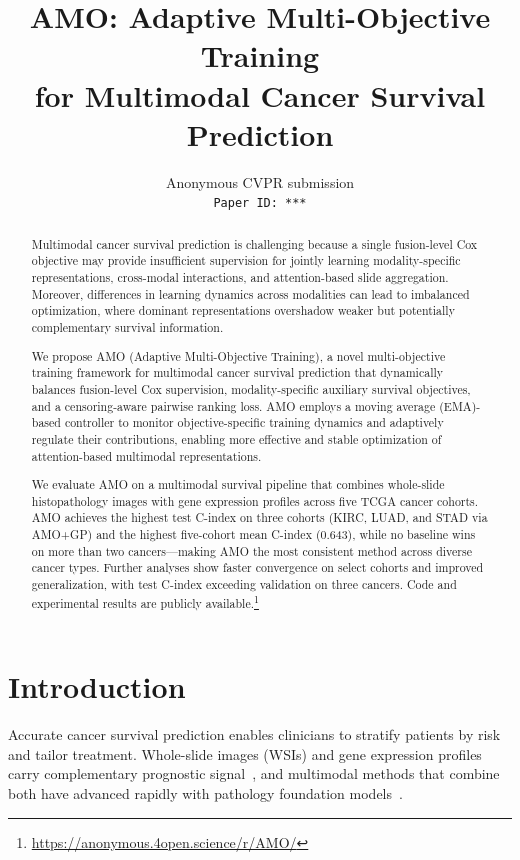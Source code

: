 \documentclass[10pt,twocolumn,letterpaper]{article}
\title{AMO: Adaptive Multi-Objective Training\\for Multimodal Cancer Survival Prediction}
\author{Anonymous CVPR submission\\
{\tt\small Paper ID: ***}}
\begin{document}
\maketitle

\begin{abstract}
Multimodal cancer survival prediction is challenging because a
single fusion-level Cox objective may provide insufficient
supervision for jointly learning modality-specific representations,
cross-modal interactions, and attention-based slide aggregation.
Moreover, differences in learning dynamics across modalities can
lead to imbalanced optimization, where dominant representations
overshadow weaker but potentially complementary survival
information.

We propose AMO (Adaptive Multi-Objective Training), a
novel multi-objective training framework for multimodal cancer survival prediction
that dynamically balances fusion-level Cox supervision,
modality-specific auxiliary survival objectives, and a
censoring-aware pairwise ranking loss. AMO employs a moving average (EMA)-based controller to monitor objective-specific
training dynamics and adaptively regulate their contributions,
enabling more effective and stable optimization of attention-based
multimodal representations.

We evaluate AMO on a multimodal survival pipeline that combines
whole-slide histopathology images with gene expression profiles
across five TCGA cancer cohorts. AMO achieves the highest test C-index on three cohorts (KIRC, LUAD, and STAD via AMO+GP) and the highest five-cohort mean C-index (0.643), while no baseline wins on more than two cancers---making AMO the most consistent method across diverse cancer types.
Further analyses show faster convergence on select cohorts and
improved generalization, with test C-index exceeding validation
on three cancers.
Code and experimental results are publicly available.\footnote{\url{https://anonymous.4open.science/r/AMO/}}
\end{abstract}


\section{Introduction}

Accurate cancer survival prediction enables clinicians to stratify
patients by risk and tailor treatment. Whole-slide images (WSIs)
and gene expression profiles carry complementary prognostic
signal~\cite{chen2021, chen2022porpoise, acosta2022,
jaume2024survpath}, and multimodal methods that combine both have
advanced rapidly with pathology foundation
models~\cite{chen2024uni, vorontsov2024virchow, lu2024conch}.
\end{document}
